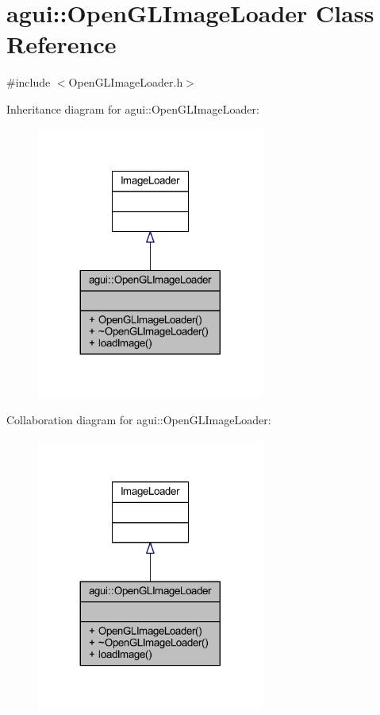 \hypertarget{classagui_1_1_open_g_l_image_loader}{}\section{agui\+:\+:Open\+G\+L\+Image\+Loader Class Reference}
\label{classagui_1_1_open_g_l_image_loader}


{\ttfamily \#include $<$Open\+G\+L\+Image\+Loader.\+h$>$}



Inheritance diagram for agui\+:\+:Open\+G\+L\+Image\+Loader\+:
\nopagebreak
\begin{figure}[H]
\begin{center}
\leavevmode
\includegraphics[width=212pt]{classagui_1_1_open_g_l_image_loader__inherit__graph}
\end{center}
\end{figure}


Collaboration diagram for agui\+:\+:Open\+G\+L\+Image\+Loader\+:
\nopagebreak
\begin{figure}[H]
\begin{center}
\leavevmode
\includegraphics[width=212pt]{classagui_1_1_open_g_l_image_loader__coll__graph}
\end{center}
\end{figure}
